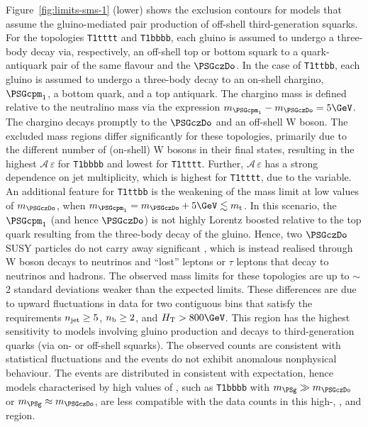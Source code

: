 Figure~\ref{fig:limits-sms-1} (lower) shows the exclusion contours
for models that assume the gluino-mediated pair production of
off-shell third-generation squarks. For the topologies \texttt{T1tttt}
and \texttt{T1bbbb}, each gluino is assumed to undergo a three-body
decay via, respectively, an off-shell top or bottom squark to a
quark-antiquark pair of the same flavour and the $\PSGczDo$. In the
case of \texttt{T1ttbb}, each gluino is assumed to undergo a
three-body decay to an on-shell chargino, $\PSGcpm_1$, a bottom quark,
and a top antiquark. The chargino mass is defined relative to the
neutralino mass via the expression $m_{\PSGcpm_1} - m_{\PSGczDo} =
5\GeV$. The chargino decays promptly to the $\PSGczDo$ and an off-shell
W boson. The excluded mass regions differ significantly for these
topologies, primarily due to the different number of (on-shell) W
bosons in their final states, resulting in the highest $\mathcal{A}
\, \varepsilon$ for \texttt{T1bbbb} and lowest for
\texttt{T1tttt}. Further, $\mathcal{A} \, \varepsilon$ has a
strong dependence on jet multiplicity, which is highest for
\texttt{T1tttt}, due to the \bdphi variable. An additional feature for
\texttt{T1ttbb} is the weakening of the mass limit at low values of
$m_{\PSGczDo}$, when $m_{\PSGcpm_1} = m_{\PSGczDo} + 5\GeV \lesssim
m_\text{t}$. In this scenario, the $\PSGcpm_1$ (and hence $\PSGczDo$) is
not highly Lorentz boosted relative to the top quark resulting from
the three-body decay of the gluino. Hence, two $\PSGczDo$ SUSY particles do
not carry away significant \ptvecmiss, which is instead realised
through W boson decays to neutrinos and ``lost'' leptons or $\tau$
leptons that decay to neutrinos and hadrons. The observed mass limits
for these topologies are up to $\sim$2 standard deviations weaker than
the expected limits. These differences are due to upward fluctuations
in data for two contiguous bins that satisfy the requirements $n_{\text{jet}}
\geq 5$, $n_{\text{b}} \geq 2$, and $\scalht > 800\GeV$. This region has the
highest sensitivity to models involving gluino production and decays
to third-generation quarks (via on- or off-shell squarks). The
observed counts are consistent with statistical fluctuations and the
events do not exhibit anomalous nonphysical behaviour. The events are
distributed in \HTmiss consistent with expectation, hence models
characterised by high values of \HTmiss, such as \texttt{T1bbbb} with
$m_{\PSg} \gg m_{\PSGczDo}$ or $m_{\PSg} \approx m_{\PSGczDo}$, are
less compatible with the data counts in this high-\njet, \nb, and
\scalht region.

